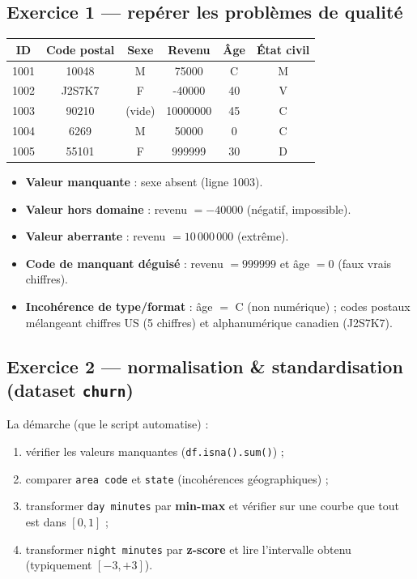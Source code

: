 \subsection{Exercice 1 — repérer les problèmes de qualité}
\begin{center}\small
\begin{tabular}{cccccc}
\toprule
ID & Code postal & Sexe & Revenu & Âge & État civil\\
\midrule
1001 & 10048 & M & 75000 & C & M\\
1002 & J2S7K7 & F & -40000 & 40 & V\\
1003 & 90210 & \cellcolor{rougeclair}(vide) & \cellcolor{rougeclair}10000000 & 45 & C\\
1004 & \cellcolor{rougeclair}6269 & M & 50000 & \cellcolor{rougeclair}0 & C\\
1005 & 55101 & F & \cellcolor{rougeclair}999999 & 30 & D\\
\bottomrule
\end{tabular}
\end{center}

\begin{Calcul}
\begin{itemize}[leftmargin=1.4em,nosep]
  \item \textbf{Valeur manquante} : sexe absent (ligne 1003).
  \item \textbf{Valeur hors domaine} : revenu $=-40000$ (négatif, impossible).
  \item \textbf{Valeur aberrante} : revenu $=10\,000\,000$ (extrême).
  \item \textbf{Code de manquant déguisé} : revenu $=999999$ et âge $=0$ (faux \og vrais \fg{} chiffres).
  \item \textbf{Incohérence de type/format} : âge $=$ \og C \fg{} (non numérique) ;
        codes postaux mélangeant chiffres US (5 chiffres) et alphanumérique canadien (J2S7K7).
\end{itemize}
\end{Calcul}

\subsection{Exercice 2 — normalisation \& standardisation (dataset \texttt{churn})}
La démarche (que le script automatise) :
\begin{enumerate}[leftmargin=1.6em,nosep]
  \item vérifier les valeurs manquantes (\texttt{df.isna().sum()}) ;
  \item comparer \texttt{area code} et \texttt{state} (incohérences géographiques) ;
  \item transformer \texttt{day minutes} par \textbf{min-max} et vérifier sur une courbe que
        tout est dans $[0,1]$ ;
  \item transformer \texttt{night minutes} par \textbf{z-score} et lire l'intervalle obtenu
        (typiquement $[-3,+3]$).
\end{enumerate}

